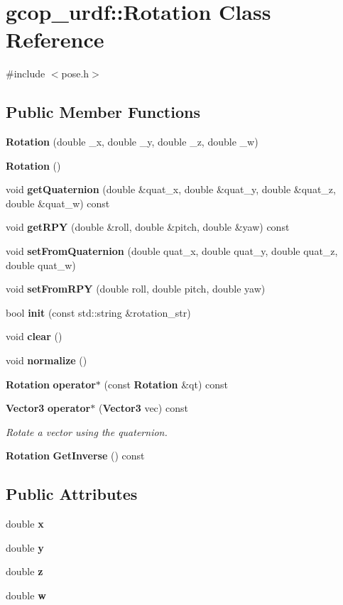 \section{gcop\-\_\-urdf\-:\-:\-Rotation \-Class \-Reference}
\label{classgcop__urdf_1_1Rotation}


{\ttfamily \#include $<$pose.\-h$>$}

\subsection*{\-Public \-Member \-Functions}
\begin{DoxyCompactItemize}
\item 
{\bf \-Rotation} (double \-\_\-x, double \-\_\-y, double \-\_\-z, double \-\_\-w)
\item 
{\bf \-Rotation} ()
\item 
void {\bf get\-Quaternion} (double \&quat\-\_\-x, double \&quat\-\_\-y, double \&quat\-\_\-z, double \&quat\-\_\-w) const 
\item 
void {\bf get\-R\-P\-Y} (double \&roll, double \&pitch, double \&yaw) const 
\item 
void {\bf set\-From\-Quaternion} (double quat\-\_\-x, double quat\-\_\-y, double quat\-\_\-z, double quat\-\_\-w)
\item 
void {\bf set\-From\-R\-P\-Y} (double roll, double pitch, double yaw)
\item 
bool {\bf init} (const std\-::string \&rotation\-\_\-str)
\item 
void {\bf clear} ()
\item 
void {\bf normalize} ()
\item 
{\bf \-Rotation} {\bf operator$\ast$} (const {\bf \-Rotation} \&qt) const 
\item 
{\bf \-Vector3} {\bf operator$\ast$} ({\bf \-Vector3} vec) const 
\begin{DoxyCompactList}\small\item\em \-Rotate a vector using the quaternion. \end{DoxyCompactList}\item 
{\bf \-Rotation} {\bf \-Get\-Inverse} () const 
\end{DoxyCompactItemize}
\subsection*{\-Public \-Attributes}
\begin{DoxyCompactItemize}
\item 
double {\bf x}
\item 
double {\bf y}
\item 
double {\bf z}
\item 
double {\bf w}
\end{DoxyCompactItemize}


